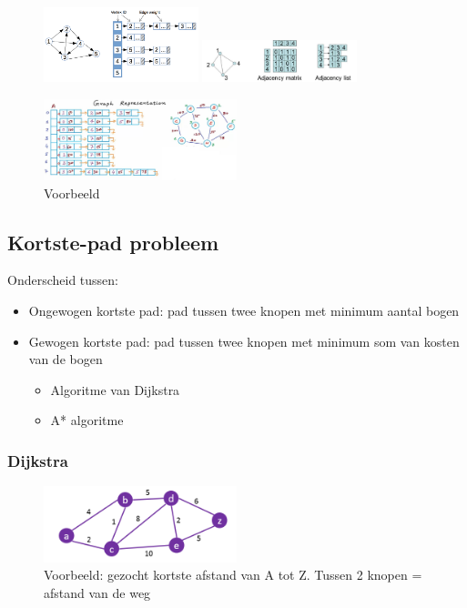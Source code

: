 \documentclass{article}
\begin{document}
\begin{figure}[H]
    \centering
    \includegraphics[width=0.4\textwidth]{adjecentielijst.png}
    \includegraphics[width=0.4\textwidth]{adjecentielijst2.png}
\end{figure}

\begin{figure}[H]
    \centering
    \includegraphics[width=0.5\textwidth]{adjecentielijst3.png}
    \caption{Voorbeeld}
\end{figure}

\subsection{Kortste-pad probleem}

Onderscheid tussen:

\begin{itemize}
    \item Ongewogen kortste pad: pad tussen twee knopen met minimum aantal bogen
    \item Gewogen kortste pad: pad tussen twee knopen met minimum som van kosten van de bogen
    \begin{itemize}
        \item Algoritme van Dijkstra
        \item A* algoritme
    \end{itemize}
\end{itemize}

\subsubsection{Dijkstra}

\begin{figure}[H]
    \centering
    \includegraphics[width=0.5\textwidth]{dijkstra.png}
    \caption{Voorbeeld: gezocht kortste afstand van A tot Z. Tussen 2 knopen = afstand van de weg}
\end{figure}
\end{document}
